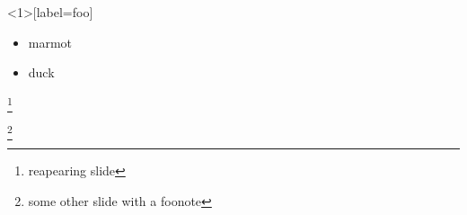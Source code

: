 \documentclass{beamer}
\begin{document}
\begin{frame}<1>[label=foo]
    \begin{itemize}
    \item marmot
    \item<alert@2> duck
    \end{itemize}
    \footnote{reapearing slide}
\end{frame} 

\begin{frame}
\footnote{some other slide with a foonote}
\end{frame}

\end{document}
